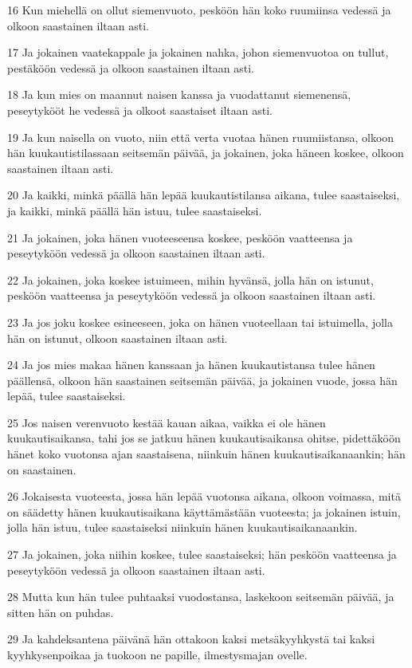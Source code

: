 \par 16 Kun miehellä on ollut siemenvuoto, pesköön hän koko ruumiinsa vedessä ja olkoon saastainen iltaan asti.
\par 17 Ja jokainen vaatekappale ja jokainen nahka, johon siemenvuotoa on tullut, pestäköön vedessä ja olkoon saastainen iltaan asti.
\par 18 Ja kun mies on maannut naisen kanssa ja vuodattanut siemenensä, peseytykööt he vedessä ja olkoot saastaiset iltaan asti.
\par 19 Ja kun naisella on vuoto, niin että verta vuotaa hänen ruumiistansa, olkoon hän kuukautistilassaan seitsemän päivää, ja jokainen, joka häneen koskee, olkoon saastainen iltaan asti.
\par 20 Ja kaikki, minkä päällä hän lepää kuukautistilansa aikana, tulee saastaiseksi, ja kaikki, minkä päällä hän istuu, tulee saastaiseksi.
\par 21 Ja jokainen, joka hänen vuoteeseensa koskee, pesköön vaatteensa ja peseytyköön vedessä ja olkoon saastainen iltaan asti.
\par 22 Ja jokainen, joka koskee istuimeen, mihin hyvänsä, jolla hän on istunut, pesköön vaatteensa ja peseytyköön vedessä ja olkoon saastainen iltaan asti.
\par 23 Ja jos joku koskee esineeseen, joka on hänen vuoteellaan tai istuimella, jolla hän on istunut, olkoon saastainen iltaan asti.
\par 24 Ja jos mies makaa hänen kanssaan ja hänen kuukautistansa tulee hänen päällensä, olkoon hän saastainen seitsemän päivää, ja jokainen vuode, jossa hän lepää, tulee saastaiseksi.
\par 25 Jos naisen verenvuoto kestää kauan aikaa, vaikka ei ole hänen kuukautisaikansa, tahi jos se jatkuu hänen kuukautisaikansa ohitse, pidettäköön hänet koko vuotonsa ajan saastaisena, niinkuin hänen kuukautisaikanaankin; hän on saastainen.
\par 26 Jokaisesta vuoteesta, jossa hän lepää vuotonsa aikana, olkoon voimassa, mitä on säädetty hänen kuukautisaikana käyttämästään vuoteesta; ja jokainen istuin, jolla hän istuu, tulee saastaiseksi niinkuin hänen kuukautisaikanaankin.
\par 27 Ja jokainen, joka niihin koskee, tulee saastaiseksi; hän pesköön vaatteensa ja peseytyköön vedessä ja olkoon saastainen iltaan asti.
\par 28 Mutta kun hän tulee puhtaaksi vuodostansa, laskekoon seitsemän päivää, ja sitten hän on puhdas.
\par 29 Ja kahdeksantena päivänä hän ottakoon kaksi metsäkyyhkystä tai kaksi kyyhkysenpoikaa ja tuokoon ne papille, ilmestysmajan ovelle.

